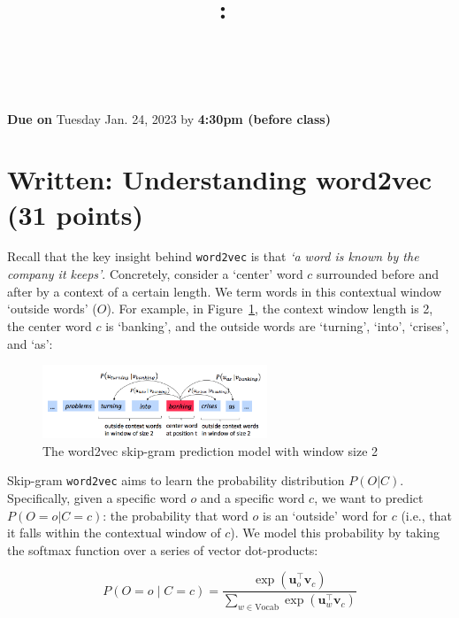 \documentclass{article}
\title{
\vspace{-1in}
\textmd{\textbf{\hmwkClass:\ \hmwkTitle} \\ \hmwkAuthorName}\\
}
\author{}
\date{}
\begin{document}
\maketitle
\vspace{-.7in}

\begin{center}
    \large{\textbf{Due on} Tuesday Jan. 24, 2023 by \textbf{4:30pm (before class)}}
\end{center}

\section{Written: Understanding word2vec (31 points)}
Recall that the key insight behind {\tt word2vec} is that \textit{`a word is known by the company it keeps'}. Concretely, consider a `center' word $c$ surrounded before and after by a context of a certain length. We term words in this contextual window `outside words' ($O$). For example, in Figure~\ref{fig:word2vec}, the context window length is 2, the center word $c$ is `banking', and the outside words are `turning', `into', `crises', and `as':

\begin{figure}[h]
    \centering
    \includegraphics[width=0.6\textwidth]{word2vec.png}
    \caption{The word2vec skip-gram prediction model with window size 2}
    \label{fig:word2vec}
\end{figure}

Skip-gram {\tt word2vec} aims to learn the probability distribution $P(O|C)$. 
Specifically, given a specific word $o$ and a specific word $c$, we want to predict $P(O=o|C=c)$: the probability that word $o$ is an `outside' word for $c$ (i.e., that it falls within the contextual window of $c$).
We model this probability by taking the softmax function over a series of vector dot-products: %

\begin{equation}
 P(O=o \mid C=c) = \frac{\exp(\bm u_{o}^\top \bm v_c)}{\sum_{w \in \text{Vocab}} \exp(\bm u_{w}^\top \bm v_c)}
 \label{word2vec_condprob}
\end{equation}
\end{document}
